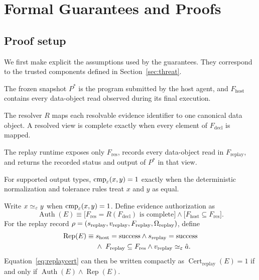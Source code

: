 \appendix
\section{Formal Guarantees and Proofs}
\label{app:proofs}

\subsection{Proof setup}

We first make explicit the assumptions used by the guarantees.
They correspond to the trusted components defined in
Section~\ref{sec:threat}.

\begin{description}
\setlength{\itemsep}{1pt}
\setlength{\parskip}{0pt}

\item[(A1) Trace fidelity.]
The frozen snapshot $P^*$ is the program submitted by the host
agent, and $F_{\mathrm{host}}$ contains every data-object read
observed during its final execution.

\item[(A2) Resolution consistency.]
The resolver $R$ maps each resolvable evidence identifier to one
canonical data object. A resolved view is complete exactly when
every element of $F_{\mathrm{decl}}$ is mapped.

\item[(A3) Replay confinement.]
The replay runtime exposes only $F_{\mathrm{res}}$, records every
data-object read in $F_{\mathrm{replay}}$, and returns the recorded
status and output of $P^*$ in that view.

\item[(A4) Comparator consistency.]
For supported output types,
$\operatorname{cmp}_{\varepsilon}(x,y)=1$ exactly when the deterministic
normalization and tolerance rules treat $x$ and $y$ as equal.
\end{description}

Write $x\simeq_{\varepsilon}y$ when
$\operatorname{cmp}_{\varepsilon}(x,y)=1$. Define evidence
authorization as
\[
\operatorname{Auth}(E)
\equiv
\bigl[
F_{\mathrm{res}}=R(F_{\mathrm{decl}})
\text{ is complete}
\bigr]
\land
\bigl[
F_{\mathrm{host}}\subseteq F_{\mathrm{res}}
\bigr].
\]
For the replay record
$\rho=
(s_{\mathrm{replay}},v_{\mathrm{replay}},
F_{\mathrm{replay}},\Omega_{\mathrm{replay}})$, define
\[
\begin{aligned}
\operatorname{Rep}(E)\equiv\;&
s_{\mathrm{host}}=\mathrm{success}
\land
s_{\mathrm{replay}}=\mathrm{success}\\
&\land\;
F_{\mathrm{replay}}\subseteq F_{\mathrm{res}}
\land
v_{\mathrm{replay}}\simeq_{\varepsilon}\hat a .
\end{aligned}
\]
Equation~\ref{eq:replaycert} can then be written compactly as
$\operatorname{Cert}_{\mathrm{replay}}(E)=1$ if and only if
$\operatorname{Auth}(E)\land\operatorname{Rep}(E)$.

